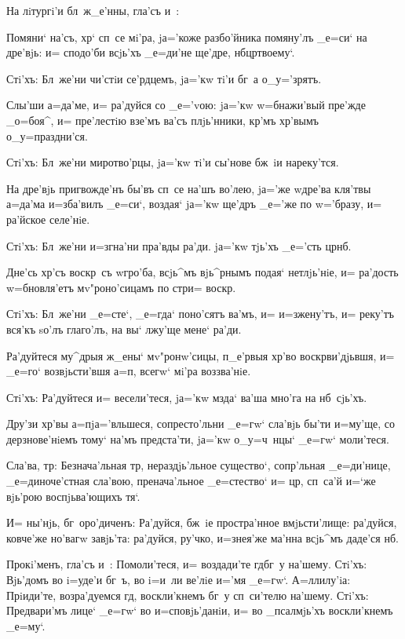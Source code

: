 На лiтургi'и бл~ж_е'нны, гла'съ и~:

Помяни` на'съ, хр` сп~се мi'ра, jа='коже 
разбо'йника помяну'лъ _е=си` на дре'вjь: и= сподо'би 
всjь'хъ _е=ди'не ще'дре, нб цр твоему`.

Стi'хъ: Бл~же'ни чи'стiи се'рдцемъ, jа='кw тi'и бг~а 
о_у='зрятъ.

Слы'ши а=да'ме, и= ра'дуйся со _е='vою: jа='кw 
w=бнажи'вый пре'жде _о=боя^, и= пре'лестiю взе'мъ ва'съ 
плjь'нники, кр'мъ хр'вымъ о_у=праздни'ся.

Стi'хъ: Бл~же'ни миротво'рцы, jа='кw тi'и сы'нове 
бж~iи нареку'тся.

На дре'вjь пригвожде'нъ бы'въ сп~се на'шъ во'лею, 
jа='же w\т дре'ва кля'твы а=да'ма и=зба'вилъ _е=си`, 
воздая` jа='кw ще'дръ _е='же по w='бразу, и= ра'йское 
селе'нiе.

Стi'хъ: Бл~же'ни и=згна'ни пра'вды ра'ди. jа='кw 
тjь'хъ _е='сть цр нб.

Дне'сь хр'съ воскр~съ w\т гро'ба, всjь^мъ 
вjь^рнымъ подая` нетлjь'нiе, и= ра'дость w=бновля'етъ 
мv"роно'сицамъ по стр и= воскр.

Стi'хъ: Бл~же'ни _е=сте`, _е=гда` поно'сятъ ва'мъ, и= 
и=зжену'тъ, и= реку'тъ вся'къ sо'лъ глаго'лъ, на вы` 
лжу'ще мене` ра'ди.

Ра'дуйтеся му^дрыя ж_ены` мv"ронw'сицы, п_е'рвыя 
хр'во воскр ви'дjьвшя, и= _е=го` возвjьсти'вшя 
а=п, всегw` мi'ра воззва'нiе.

Стi'хъ: Ра'дуйтеся и= весели'теся, jа='кw мзда` ва'ша 
мно'га на нб~сjь'хъ.

Дру'зи хр'вы а=п jа='вльшеся, сопресто'льни 
_е=гw` сла'вjь бы'ти и=му'ще, со дерзнове'нiемъ тому` 
на'мъ предста'ти, jа='кw о_у=ч~нцы` _е=гw` моли'теся.

Сла'ва, тр: Безнача'льная тр, нераздjь'льное 
существо`, сопр'льная _е=ди'нице, _е=диноче'стная 
сла'вою, пренача'льное _е=стество` и= цр, сп~са'й 
и=`же вjь'рою воспjьва'ющихъ тя`.

И= ны'нjь, бг~оро'диченъ: Ра'дуйся, бж~iе простра'нное 
вмjьсти'лище: ра'дуйся, ковче'же но'вагw завjь'та: 
ра'дуйся, ру'чко, и=з\ъ нея'же ма'нна всjь^мъ даде'ся 
нб.

Прокi'менъ, гла'съ и~: Помоли'теся, и= воздади'те 
гд бг~у на'шему. Стi'хъ: Вjь'домъ во i=уде'и бг~ъ, 
во i=и~ли ве'лiе и='мя _е=гw`. А=ллилу'iа: Прiиди'те, 
возра'дуемся гд, воскли'кнемъ бг~у сп~си'телю 
на'шему. Стi'хъ: Предвари'мъ лице` _е=гw` во 
и=сповjь'данiи, и= во _псалмjь'хъ воскли'кнемъ _е=му`.

